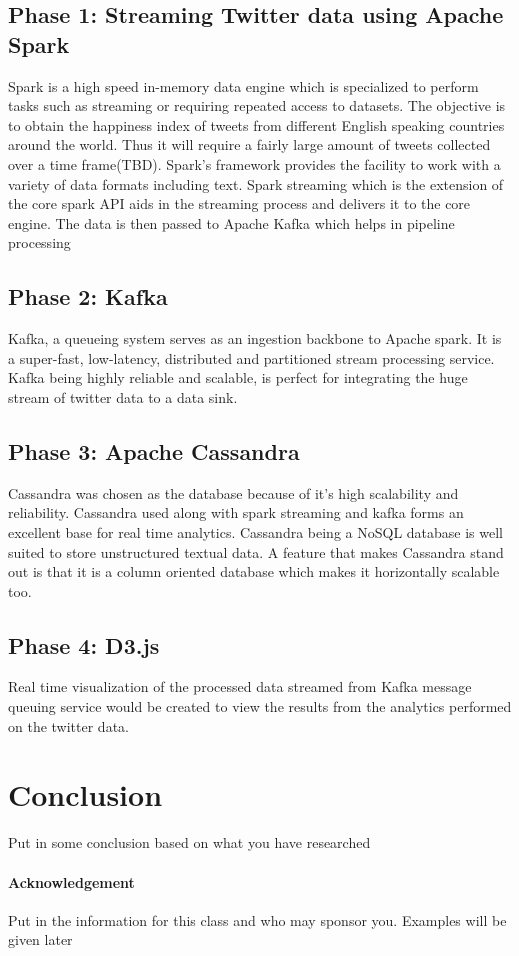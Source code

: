 \documentclass[9pt,twocolumn,twoside]{../../styles/osajnl}
\begin{document}
\subsection{Phase 1: Streaming Twitter data using Apache Spark}
Spark is a high speed in-memory data engine which is specialized to perform tasks such as streaming or requiring repeated access to datasets. The objective is to obtain the happiness index of tweets from different English speaking countries around the world. Thus it will require a fairly large amount of tweets collected over a time frame(TBD). Spark's framework provides the facility to work with a variety of data formats including text. Spark streaming which is the extension of the core spark API aids in the streaming process and delivers it to the core engine. The data is then passed to Apache Kafka which helps in pipeline processing
\subsection{Phase 2: Kafka}
Kafka, a queueing system serves as an ingestion backbone to Apache spark. It is a super-fast, low-latency, distributed and partitioned stream processing service. Kafka being highly reliable and scalable, is perfect for integrating the huge stream of twitter data to a data sink. 

\subsection{Phase 3: Apache Cassandra}
Cassandra was chosen as the database because of it's high scalability and reliability. Cassandra used along with spark streaming and kafka forms an excellent base for real time analytics. Cassandra being a NoSQL database is well suited to store unstructured textual data. A feature that makes Cassandra stand out is that it is a column oriented database which makes it horizontally scalable too. 

\subsection{Phase 4: D3.js}

Real time visualization of the processed data streamed from Kafka message queuing service would be created to view the results from the analytics performed on the twitter data.


\section{Conclusion}

Put in some conclusion based on what you have researched

\paragraph{Acknowledgement}

Put in the information for this class and who may sponsor
you. Examples will be given later

\end{document}
